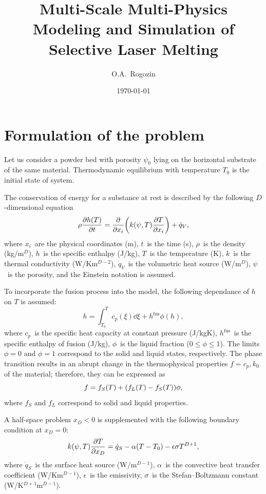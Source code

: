 \documentclass{article}
\title{Multi-Scale Multi-Physics Modeling and Simulation of Selective Laser Melting}
\date{\today}
\author{O.A.~Rogozin} %
\newcommand{\fusion}[1]{{#1}^\mathrm{fus}}
\begin{document}
\maketitle
\tableofcontents

\section{Formulation of the problem}\label{sec:formulation}

Let us consider a powder bed with porosity \(\psi_0\) lying on the horizontal substrate of the same material.
Thermodynamic equilibrium with temperature \(T_0\) is the initial state of system.

The conservation of energy for a substance at rest is described by the following \(D\)-dimensional equation
\begin{equation}\label{eq:heat_conduction}
    \rho\pdv{h(T)}{t} = \pdv{x_i}\qty( k(\psi,T)\pdv{T}{x_i} ) + \dot{q}_V,
\end{equation}
where \(x_i\)~are the physical coordinates (\si{m}), \(t\)~is the time (\si{s}),
\(\rho\)~is the density (\si{kg/m}\(^D\)), \(h\)~is the specific enthalpy (\si{J/kg}),
\(T\)~is the temperature (\si{\K}), \(k\)~is the thermal conductivity (\si{W/Km}\(^{D-2}\)),
\(\dot{q}_V\)~is the volumetric heat source (\si{W/m}\(^D\)), \(\psi\)~is the porosity,
and the Einstein notation is assumed.

To incorporate the fusion process into the model, the following dependance of \(h\) on \(T\) is assumed:
\begin{equation}\label{eq:enthalpy}
    h = \int_{T_0}^T c_p(\xi)\dd{\xi} + \fusion{h}\phi(h),
\end{equation}
where \(c_p\)~is the specific heat capacity at constant pressure (\si{J/kgK}),
\(\fusion{h}\)~is the specific enthalpy of fusion (\si{J/kg}),
\(\phi\)~is the liquid fraction (\(0 \leq \phi \leq 1\)).
The limits \(\phi=0\) and \(\phi=1\) correspond to the solid and liquid states, respectively.
The phase transition results in an abrupt change in the thermophysical properties \(f=c_p,k_0\) of the material;
therefore, they can be expressed as
\begin{equation}\label{eq:fusion_change}
    f = f_S(T) + \qty( f_L(T) - f_S(T) )\phi,
\end{equation}
where \(f_S\) and \(f_L\) correspond to solid and liquid properties.

A half-space problem \(x_D<0\) is supplemented with the following boundary condition at \(x_D=0\):
\begin{equation}\label{eq:bc}
    k(\psi,T)\pdv{T}{x_D} = \dot{q}_S - \alpha(T-T_0) - \epsilon\sigma T^{D+1},
\end{equation}
where \(\dot{q}_S\)~is the surface heat source (\si{W/m}\(^{D-1}\)),
\(\alpha\)~is the convective heat transfer coefficient (\si{W/Km}\(^{D-1}\)),
\(\epsilon\)~is the emissivity, \(\sigma\)~is the Stefan--Boltzmann constant (\si{W/K}\(^{D+1}\)\si{m}\(^{D-1}\)).
\end{document}
